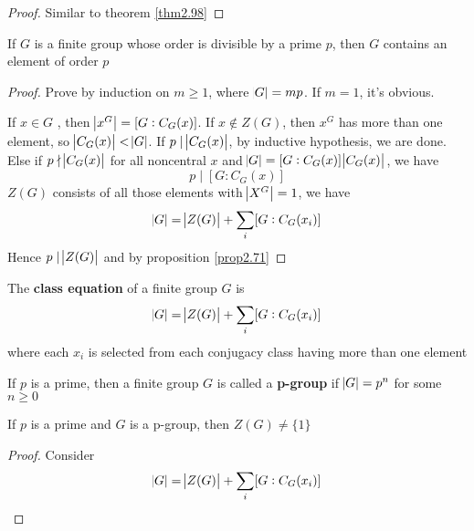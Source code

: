 \documentclass[11pt]{article}
\begin{document}
\begin{proof}
Similar to theorem \ref{thm2.98}
\end{proof}

\begin{theorem}[Cauchy]
\label{thmCauchy}
If \(G\) is a finite group whose order is divisible by a prime \(p\), then \(G\)
contains an element of order \(p\)
\end{theorem}

\begin{proof}
Prove by induction on \(m\ge 1\), where \(\abs{G}=mp\). If \(m=1\), it's obvious.

If \(x\in G\) , then \(\abs{x^G}=[G:C_G(x)]\). If \(x\not\in Z(G)\), then \(x^G\)
has more than one element, so \(\abs{C_G(x)}<\abs{G}\). If \(p\mid \abs{C_G(x)}\), by
inductive hypothesis, we are done. Else if \(p\nmid \abs{C_G(x)}\) for all
noncentral \(x\) and \(\abs{G}=[G:C_G(x)]\abs{C_G(x)}\), we have
\begin{equation*}
p\mid[G:C_G(x)]
\end{equation*}
\(Z(G)\) consists of all those elements with \(\abs{X^G}=1\), we have
\begin{equation*}
\abs{G}=\abs{Z(G)}+\displaystyle\sum_i[G:C_G(x_i)]
\end{equation*}
Hence \(p\mid\abs{Z(G)}\) and by proposition \ref{prop2.71}
\end{proof}

\begin{definition}[]
The \textbf{class equation} of a finite group \(G\) is
\begin{equation*}
\abs{G}=\abs{Z(G)}+\displaystyle\sum_i[G:C_G(x_i)]
\end{equation*}
where each \(x_i\) is selected from each conjugacy class having more than one element
\end{definition}

\begin{definition}[]
If \(p\) is a prime, then a finite group \(G\) is called a \textbf{p-group} if
\(\abs{G}=p^n\) for some \(n\ge 0\)
\end{definition}

\begin{theorem}[]
\label{thm2.103}
If \(p\) is a prime and \(G\) is a p-group, then \(Z(G)\neq\{1\}\)
\end{theorem}

\begin{proof}
Consider 
\begin{equation*}
\abs{G}=\abs{Z(G)}+\displaystyle\sum_i[G:C_G(x_i)]
\end{equation*}
\end{proof}
\end{document}
